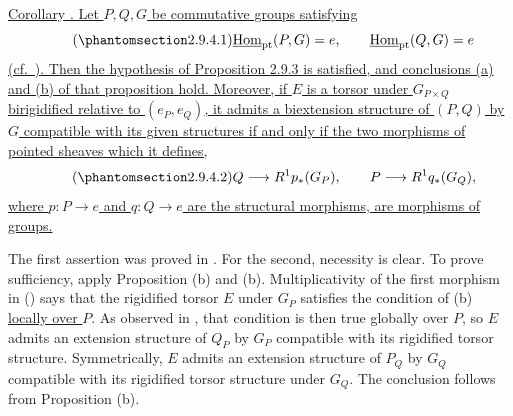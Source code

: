
\underline{Corollary . Let $P,Q,G$ be commutative groups
satisfying}
\begin{equation}\tag{\SGARefTarget{sga7.sga7i.evii.n2-9-4-1}{2.9.4.1}}
 \underline{\operatorname{Hom}}_{\mathrm{pt}}(P,G)=e,
 \qquad
 \underline{\operatorname{Hom}}_{\mathrm{pt}}(Q,G)=e
\end{equation}
\underline{(cf.\ ). Then the hypothesis of Proposition 2.9.3 is
satisfied, and conclusions (a) and (b) of that proposition hold.
Moreover, if $E$ is a torsor under $G_{P\times Q}$ birigidified
relative to $(e_P,e_Q)$, it admits a biextension structure of $(P,Q)$
by $G$ compatible with its given structures if and only if the two
morphisms of pointed sheaves which it defines,}
\begin{equation}\tag{\SGARefTarget{sga7.sga7i.evii.n2-9-4-2}{2.9.4.2}}
 Q\longrightarrow R^1p_*(G_P),
 \qquad
 P\longrightarrow R^1q_*(G_Q),
\end{equation}
\underline{where $p:P\longrightarrow e$ and $q:Q\longrightarrow e$
are the structural morphisms, are morphisms of groups.}

The first assertion was proved in . For the second, necessity is
clear. To prove sufficiency, apply Proposition (b) and (b).
Multiplicativity of the first morphism in () says that the
rigidified torsor $E$ under $G_P$ satisfies the condition of (b)
\underline{locally over $P$}. As observed in , that condition is
then true globally over $P$, so $E$ admits an extension structure of
$Q_P$ by $G_P$ compatible with its rigidified torsor structure.
Symmetrically, $E$ admits an extension structure of $P_Q$ by $G_Q$
compatible with its rigidified torsor structure under $G_Q$. The
conclusion follows from Proposition (b).

